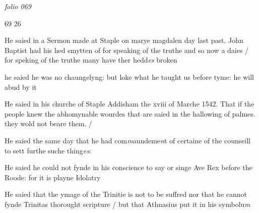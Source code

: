 \documentclass[12pt, a4paper]{book}
\begin{document}
\dotfill
						\newpage
{}

\textit{folio 069}


\begin{flushright}{\color{Mahogany}69} 26\end{flushright}

	
				\marginpar[\vspace{0.5cm}{\textcolor{Gray}{seditious}}]{}
			
	
		\ifthenelse{\isodd{\thepage}}
		{\reversemarginpar}
		{\normalmarginpar}
		He saied in a Sermon made at Staple on marye
 magdalen day last past. John Baptist had
 his hed smytten of for speaking of the truthe
 and so now a daies / for speking of the truthe
 many have ther hedd\textit{es} broken
	
		\ifthenelse{\isodd{\thepage}}
		{\reversemarginpar}
		{\normalmarginpar}
		he saied he was no chaungelyng: but loke what
 he taught us before tyme: he will abud by it

	
				\marginpar[\vspace{0.5cm}{\textcolor{Gray}{palmes}}]{}
			
	
		\ifthenelse{\isodd{\thepage}}
		{\reversemarginpar}
		{\normalmarginpar}
		He saied in his churche of Staple
			 Addisham the xviii of
 Marche 1542. That if the people knew the
 abhomynable wourdes that are saied in the
 hallowing of palmes. they wold not beare
 them. /
 
				\marginpar[\vspace{0.5cm}{\textcolor{Gray}{sclanderous to me}}]{}
			 
		\ifthenelse{\isodd{\thepage}}
		{\reversemarginpar}
		{\normalmarginpar}
		He saied the same day that he had com\textit{m}aundeme\textit{n}t
 of certaine of the counseill to sett furthe suche
 thing\textit{es}:
 
				\marginpar[\vspace{0.5cm}{\textcolor{Gray}{sclanderous}}]{}
			 
		\ifthenelse{\isodd{\thepage}}
		{\reversemarginpar}
		{\normalmarginpar}
		He saied he could not fynde in his conscience to
 say or singe Ave Rex before the Roode: for it
 is playne Idolatry
 
			 
		\ifthenelse{\isodd{\thepage}}
		{\reversemarginpar}
		{\normalmarginpar}
		He saied that the ymage of the Trinitie is not
 to be suffred nor that he cannot fynde Trinitas
 thorought scripture / but that Athnasius put
 it in his symbolu\textit{m}
 
\end{document}
